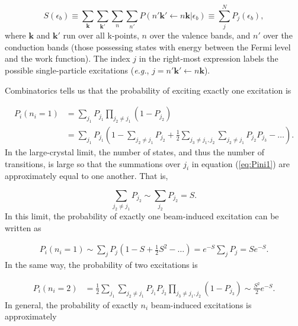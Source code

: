 \documentclass[twoside,twocolumn,9pt]{article}
\begin{document}
\begin{equation}
  S(\epsilon_b)
  \equiv
  \sum_\mathbf{k} \sum_\mathbf{k'} \sum_n \sum_{n'}
  P(n'\mathbf{k}'\leftarrow n\mathbf{k}|\epsilon_b)
  \equiv
  \sum_j^N P_j(\epsilon_b),
  \label{eq:S}
\end{equation}
%
where $\mathbf{k}$ and $\mathbf{k'}$ run over all k-points, $n$ over
the valence bands, and $n'$ over the conduction bands (those possessing states
with energy between the Fermi level and the work function).
The index $j$ in the right-most expression labels the possible single-particle
excitations (\textit{e.g.}, $j=n'\mathbf{k'}\leftarrow n\mathbf{k}$).

Combinatorics tells us that the probability of exciting exactly one excitation
is

\begin{equation}
  \begin{aligned}
    P_i(n_i=1)
    &=
    \sum_{j_1} P_{j_1}
    \prod_{j_2\neq j_1} (1 - P_{j_2})
    \\&=
    \sum_{j_1} P_{j_1}
    \left(
      1 - \sum_{j_2\neq j_1} P_{j_2}
      + \frac{1}{2} \sum_{j_3\neq j_1,j_2} \sum_{j_2\neq j_1} P_{j_2} P_{j_3}
      - \dots
    \right).
  \label{eq:Pini1}
  \end{aligned}
\end{equation}
%
In the large-crystal limit, the number of states, and thus the number of
transitions, is large so that the summations over $j_i$ in equation
(\ref{eq:Pini1}) are approximately equal to one another.
That is,

\begin{equation}
  \sum_{j_2\neq j_1}P_{j_2}
  \sim
  \sum_{j_2}P_{j_2}
  =
  S.
\end{equation}
%
In this limit, the probability of exactly one beam-induced excitation can be
written as

\begin{equation}
  \begin{aligned}
  P_i(n_i=1)
  \sim
  \sum_j P_j
  \left( 1 - S + \frac{1}{2}S^2 - \dots \right)
  =
  e^{-S}\sum_j P_j
  =
  Se^{-S}.
\end{aligned}
\label{eq:Pi(1)}
\end{equation}
%
In the same way, the probability of two excitations is

\begin{equation}
\begin{aligned}
  P_i(n_i=2)
  &=
  \frac{1}{2} \sum_{j_1} \sum_{j_2\neq j_1} P_{j_1} P_{j_2}
  \prod_{j_3\neq j_1,j_2} (1 - P_{j_3})
  \sim
  \frac{S^2}{2}e^{-S}.
\end{aligned}
\end{equation}
%
In general, the probability of exactly $n_i$ beam-induced excitations is
approximately
\end{document}

